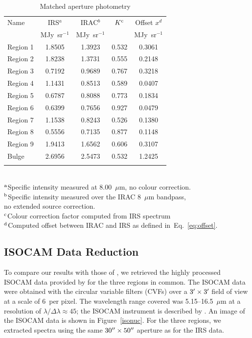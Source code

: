 \begin{table}
 \centering
 \begin{minipage}{100mm}
\caption{Matched aperture photometry}
  \begin{tabular}{lcccc}
  \hline{Name}&{IRS$^{a}$}&{IRAC$^{b}$}&{$K^{\rm c}$}&{Offset $x^d$} \\ 
{} & { MJy~sr$^{-1}$} & { MJy~sr$^{-1}$} & &  MJy~sr$^{-1}$
   \\
 \hline
 Region 1 & 1.8505 & 1.3923 & 0.532 & 0.3061
 \\ Region 2  & 1.8238 & 1.3731 & 0.555 & 0.2148
 \\ Region 3 & 0.7192 & 0.9689 & 0.767 & 0.3218
 \\ Region 4 & 1.1431 & 0.8513 & 0.589 & 0.0407
 \\  Region 5 & 0.6787 & 0.8088 & 0.773 & 0.1834
 \\  Region 6  & 0.6399 & 0.7656 & 0.927 & 0.0479
 \\  Region 7  & 1.1538 & 0.8243 & 0.526 & 0.1380
 \\ Region 8 & 0.5556 & 0.7135 & 0.877 & 0.1148
 \\  Region 9 & 1.9413 & 1.6562 & 0.606 & 0.3107 
 \\ Bulge & 2.6956 & 2.5473 & 0.532 & 1.2425\\
\hline
 \label{colourK}
\end{tabular}\\
 {$^{\rm a}$Specific intensity measured at 8.00~$\mu$m, no colour correction.\\
 $^{\rm b}$Specific intensity measured over the IRAC 8~$\mu$m bandpass,\\ no extended source correction.\\
$^{\rm c}$Colour correction factor computed from IRS spectrum\\
 $^{\rm d}$Computed offset between IRAC and IRS as defined in~Eq.~\ref{eq:offset}. }
\end{minipage}
\end{table}

	


\subsection{ISOCAM Data Reduction}
\label{sect:iso_data}

To compare our results with those of  \citet{1998Cesarsky}, we retrieved the highly processed ISOCAM data provided by \citet{Boulanger_F_2005}  
for the three regions in common. 
The ISOCAM data were obtained with the circular variable filters (CVFs) over a $3\hbox{$^\prime$} \times 3\hbox{$^\prime$}$ field of view at a scale of 6\arcsec\ per pixel. 
The wavelength range covered was 5.15--16.5~$\mu$m at a resolution of $\lambda/\Delta \lambda \approx 45$; the ISOCAM instrument is described by \citet{cesarsky1996}.
An image of the ISOCAM data is shown in Figure~\ref{isonuc}.  For the three regions, we extracted spectra using the same 
$30\hbox{$^{\prime\prime}$}\times50\hbox{$^{\prime\prime}$}$ aperture as for the IRS data. 


